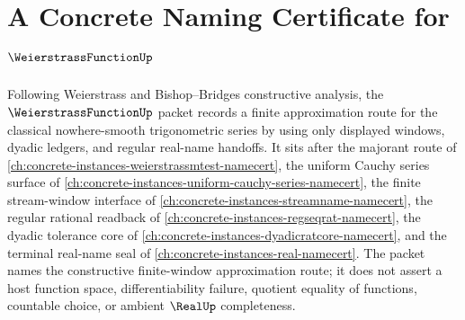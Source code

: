 \chapter{A Concrete Naming Certificate for $\WeierstrassFunctionUp$}
\label{ch:concrete-instances-weierstrass-function-namecert}

Following Weierstrass and Bishop--Bridges constructive analysis, the $\WeierstrassFunctionUp$ packet records a finite approximation route for the classical nowhere-smooth trigonometric series by using only displayed windows, dyadic ledgers, and regular real-name handoffs. It sits after the majorant route of \autoref{ch:concrete-instances-weierstrassmtest-namecert}, the uniform Cauchy series surface of \autoref{ch:concrete-instances-uniform-cauchy-series-namecert}, the finite stream-window interface of \autoref{ch:concrete-instances-streamname-namecert}, the regular rational readback of \autoref{ch:concrete-instances-regseqrat-namecert}, the dyadic tolerance core of \autoref{ch:concrete-instances-dyadicratcore-namecert}, and the terminal real-name seal of \autoref{ch:concrete-instances-real-namecert}. The packet names the constructive finite-window approximation route; it does not assert a host function space, differentiability failure, quotient equality of functions, countable choice, or ambient $\RealUp$ completeness.

